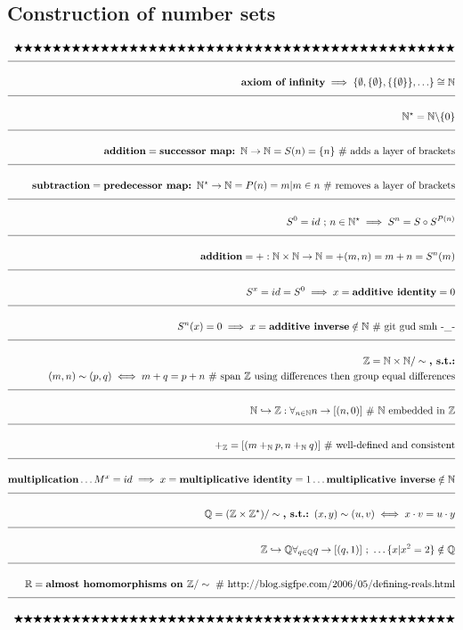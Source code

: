 \documentclass[a4paper]{article}
\newcommand{\melazy}{\bigstar\bigstar\bigstar\bigstar\bigstar\bigstar\bigstar\bigstar\bigstar\bigstar\bigstar\bigstar\bigstar\bigstar\bigstar\bigstar\bigstar\bigstar\bigstar\bigstar\bigstar\bigstar\bigstar\bigstar\bigstar\bigstar\bigstar\bigstar\bigstar\bigstar\bigstar\bigstar\bigstar\bigstar\bigstar\bigstar\bigstar\bigstar\bigstar\bigstar\bigstar\bigstar\bigstar\bigstar\bigstar\bigstar}
\newcommand{\eqComment}[1]{\text{  \# #1}}
\newcommand{\eqSep}{\text{ ;  }}
\newcommand{\n}{\\[1.5ex] \hline \nonumber \\[0ex]}
\newcommand{\m}{\nonumber \\}
\begin{document}
\subsection{Construction of number sets}
\begin{tcolorbox}
\begin{align}
   \melazy
\n \textbf{axiom of infinity} \implies \{\emptyset, \{\emptyset\}, \{\{\emptyset\}\}, \ldots\} \cong \mathbb{N}
\n \mathbb{N}^\star = \mathbb{N} \backslash \{0\}
\n \textbf{addition} = \textbf{successor map: $\mathbb{N} \to \mathbb{N}$} = S(n) = \{n\} \eqComment{adds a layer of brackets}
\n \textbf{subtraction} = \textbf{predecessor map: $\mathbb{N}^\star \to \mathbb{N}$} = P(n) = m | m \in n \eqComment{removes a layer of brackets}
\n S^0 = id \eqSep n \in \mathbb{N}^\star \implies S^n = S \circ S^{P(n)}
\n \textbf{addition} = +: \mathbb{N} \times \mathbb{N} \to \mathbb{N} = +(m, n) = m + n = S^n(m)
\n S^x = id = S^0 \implies x = \textbf{additive identity} = 0 
\n S^n(x) = 0 \implies x = \textbf{additive inverse} \notin \mathbb{N} \eqComment{git gud smh -\_-}
\n \mathbb{Z} = \mathbb{N} \times \mathbb{N} / \sim \textbf{, s.t.:}
\m (m, n) \sim (p, q) \iff m + q = p + n \eqComment{span $\mathbb{Z}$ using differences then group equal differences}
\n \mathbb{N} \hookrightarrow \mathbb{Z}: \forall_{n \in \mathbb{N}} n \to [(n, 0)] \eqComment{$\mathbb{N}$ embedded in $\mathbb{Z}$}
\n +_\mathbb{Z} = [(m +_\mathbb{N} p, n +_\mathbb{N} q)] \eqComment{well-defined and consistent}
\n \textbf{multiplication} \ldots M^x = id \implies x = \textbf{multiplicative identity} = 1 \ldots \textbf{multiplicative inverse} \notin \mathbb{N}
\n \mathbb{Q} = (\mathbb{Z} \times \mathbb{Z}^\star) / \sim \textbf{, s.t.: } (x,y) \sim (u,v) \iff x \cdot v = u \cdot y
\n \mathbb{Z} \hookrightarrow \mathbb{Q} \forall_{q \in \mathbb{Q}} q \to [(q,1)] \eqSep \ldots \{x | x^2 = 2\} \notin \mathbb{Q}
\n \mathbb{R} = \textbf{almost homomorphisms on $\mathbb{Z}$} / \sim \eqComment{http://blog.sigfpe.com/2006/05/defining-reals.html}
\n \melazy
\end{align}
\end{tcolorbox}
\end{document}
